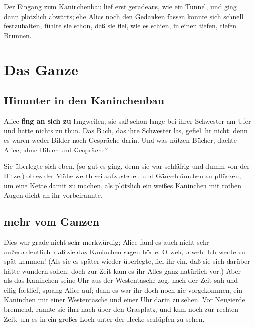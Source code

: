 \documentclass[DIV=calc,10pt,parskip=half,twocolumn]{scrartcl}
\begin{document}
Der Eingang zum Kaninchenbau lief erst geradeaus, wie ein Tunnel, und ging dann
plötzlich abwärts; ehe Alice noch den Gedanken fassen konnte sich schnell
festzuhalten, fühlte sie schon, daß sie fiel, wie es schien, in einen tiefen,
tiefen Brunnen.

\clearpage


\section{Das Ganze}



\subsection{Hinunter in den Kaninchenbau}

Alice {\bfseries fing an sich zu} langweilen; sie saß schon lange bei ihrer Schwester am
Ufer und hatte nichts zu thun. Das Buch, das ihre Schwester las, gefiel ihr
nicht; denn es waren weder Bilder noch Gespräche darin. \grqq{} Und was nützen
Bücher,\grqq{}  dachte Alice, \grqq{}ohne Bilder und Gespräche?\grqq 

Sie überlegte sich eben, (so gut es ging, denn sie war schläfrig und dumm von
der Hitze,) ob es der Mühe werth sei aufzustehen und Gänseblümchen zu pflücken,
um eine Kette damit zu machen, als plötzlich ein weißes Kaninchen mit rothen
Augen dicht an ihr vorbeirannte.

\subsection{mehr vom Ganzen}

Dies war grade nicht sehr merkwürdig; Alice fand es auch nicht sehr
außerordentlich, daß sie das Kaninchen sagen hörte: \grqq{} O weh, o weh! Ich werde zu
spät kommen!\grqq{}  (Als sie es später wieder überlegte, fiel ihr ein, daß sie sich
darüber hätte wundern sollen; doch zur Zeit kam es ihr Alles ganz natürlich
vor.) Aber als das Kaninchen seine Uhr aus der Westentasche zog, nach der Zeit
sah und eilig fortlief, sprang Alice auf; denn es war ihr doch noch nie
vorgekommen, ein Kaninchen mit einer Westentasche und einer Uhr darin zu sehen.
Vor Neugierde brennend, rannte sie ihm nach über den Grasplatz, und kam noch
zur rechten Zeit, um es in ein großes Loch unter der Hecke schlüpfen zu sehen.
\end{document}

